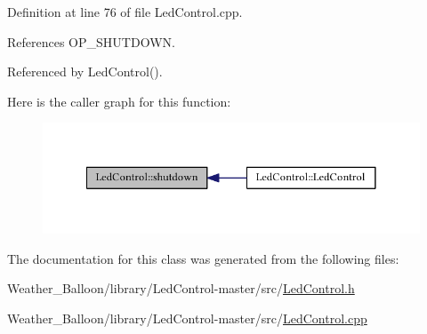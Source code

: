Definition at line 76 of file Led\+Control.\+cpp.



References O\+P\+\_\+\+S\+H\+U\+T\+D\+O\+WN.



Referenced by Led\+Control().



Here is the caller graph for this function\+:\nopagebreak
\begin{figure}[H]
\begin{center}
\leavevmode
\includegraphics[width=341pt]{class_led_control_acae3eb6d78fc9b978fe6968611e48466_icgraph}
\end{center}
\end{figure}




The documentation for this class was generated from the following files\+:\begin{DoxyCompactItemize}
\item 
Weather\+\_\+\+Balloon/library/\+Led\+Control-\/master/src/\hyperlink{_led_control_8h}{Led\+Control.\+h}\item 
Weather\+\_\+\+Balloon/library/\+Led\+Control-\/master/src/\hyperlink{_led_control_8cpp}{Led\+Control.\+cpp}\end{DoxyCompactItemize}
